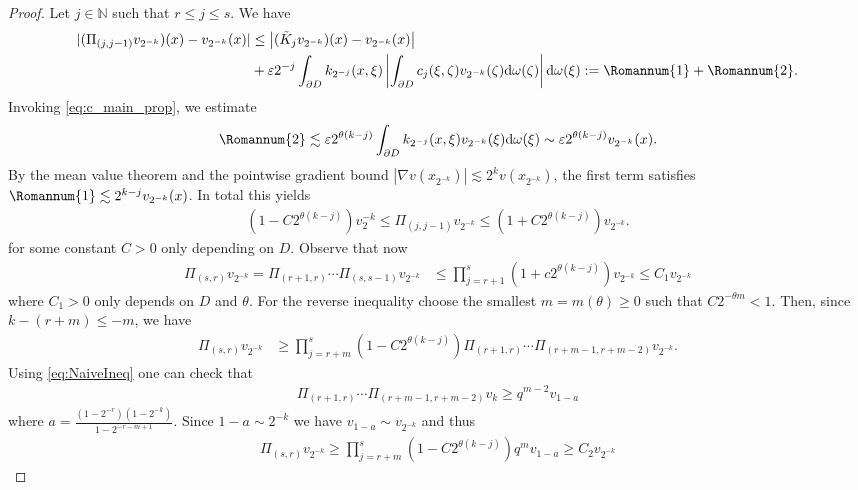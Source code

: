 \documentclass[a4paper,12pt]{article}
\theoremstyle{definition}
\theoremstyle{definition}
\begin{document}
		\begin{proof}
			Let $j\in\mathbb{N}$ such that $r\leq j\leq s$. We have
			\begin{align*}
				|(\Pi_{(j,j-1)}v_{2^{-k}})(x) -v_{2^{-k}}(x)|&\leq\left|(\tilde K_{j}v_{2^{-k}})(x)-v_{2^{-k}}(x)\right|\\
				&+\varepsilon 2^{-j}\int_{\partial D} k_{2^{-j}}(x,\xi)\left|\int_{\partial D}c_j(\xi,\zeta)v_{2^{-k}}(\zeta)\mathrm d \omega(\zeta)\right|\mathrm{d}\omega(\xi):=\Romannum{1}+\Romannum{2}.
			\end{align*}
			Invoking \eqref{eq:c_main_prop}, we estimate
			\begin{align*}
				\Romannum{2}\lesssim\varepsilon2^{\theta(k-j)}\int_{\partial D} k_{2^{-j}}(x,\xi)v_{2^{-k}}(\xi)\mathrm d\omega(\xi)\sim\varepsilon2^{\theta(k-j)}v_{2^{-k}}(x).
			\end{align*}
			By the mean value theorem and the pointwise gradient bound $|\nabla v(x_{2^{-k}})|\lesssim 2^kv(x_{2^{-k}})$, the first term satisfies $\Romannum{1}\lesssim 2^{k-j}v_{2^{-k}}(x)$. In total this yields
			\begin{align*}
				(1-C2^{\theta(k-j)})v_2^{-k}\leq\Pi_{(j,j-1)}v_{2^{-k}}\leq (1+C2^{\theta(k-j)})v_{2^{-k}}.
			\end{align*}
			for some constant $C>0$ only depending on $D$. Observe that now 
			\begin{align*}
				\Pi_{(s,r)}v_{2^{-k}}=\Pi_{(r+1,r)}\cdots\Pi_{(s,s-1)}v_{2^{-k}}&\leq \prod_{j=r+1}^{s}(1+c2^{\theta(k-j)})v_{2^{-k}}\leq C_1 v_{2^{-k}}
			\end{align*}
			where $C_1>0$ only depends on $D$ and $\theta$. For the reverse inequality choose the smallest $m=m(\theta)\geq0$ such that $C2^{-\theta m}<1$. Then, since $k-(r+m)\leq-m$, we have
			\begin{align*}
				\Pi_{(s,r)}v_{2^{-k}}&\geq \prod_{j=r+m}^{s}(1-C2^{\theta(k-j)})\Pi_{(r+1,r)}\cdots\Pi_{(r+m-1,r+m-2)} v_{2^{-k}}.
			\end{align*}
			Using \eqref{eq:NaiveIneq} one can check that 
			\begin{align*}
				\Pi_{(r+1,r)}\cdots\Pi_{(r+m-1,r+m-2)} v_k\geq q^{m-2} v_{1-a}
			\end{align*}
			where $a=\frac{(1-2^{-r})(1-2^{-k})}{1-2^{-r-m+1}}$. Since $1-a\sim2^{-k}$ we have $v_{1-a}\sim v_{2^{-k}}$ and thus
			\begin{align*}
				\Pi_{(s,r)}v_{2^{-k}}\geq\prod_{j=r+m}^{s}(1-C2^{\theta(k-j)})q^m v_{1-a}\geq C_2v_{2^{-k}}
			\end{align*}
		\end{proof}
\end{document}
